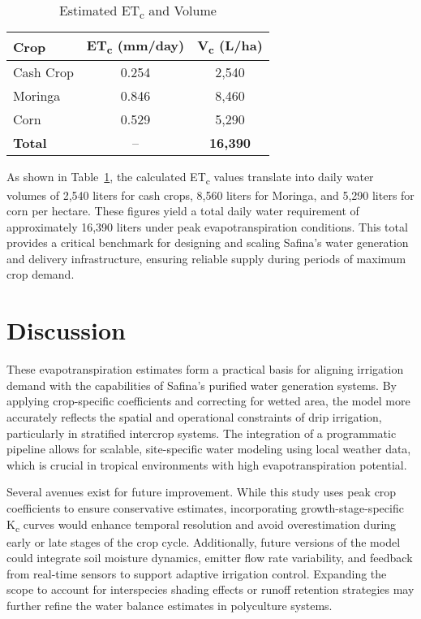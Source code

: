 \documentclass[twocolumn]{article}
\begin{document}
\begin{table}[h]
\centering
\caption{Estimated ET\textsubscript{c} and Volume}
\label{tab:et-results}
\begin{tabular}{lcc}
\hline
\textbf{Crop} & \textbf{ET\textsubscript{c} (mm/day)} & \textbf{V\textsubscript{c} (L/ha)} \\
\hline
Cash Crop & 0.254 & 2,540 \\
Moringa  & 0.846 & 8,460 \\
Corn     & 0.529 & 5,290 \\
\hline
\textbf{Total} & -- & \textbf{16,390} \\
\hline
\end{tabular}
\end{table}

As shown in Table~\ref{tab:et-results}, the calculated ET\textsubscript{c} values translate into daily water volumes of 2,540 liters for cash crops, 8,560 liters for Moringa, and 5,290 liters for corn per hectare. These figures yield a total daily water requirement of approximately 16,390 liters under peak evapotranspiration conditions. This total provides a critical benchmark for designing and scaling Safina’s water generation and delivery infrastructure, ensuring reliable supply during periods of maximum crop demand.

\section{Discussion}
These evapotranspiration estimates form a practical basis for aligning irrigation demand with the capabilities of Safina’s purified water generation systems. By applying crop-specific coefficients and correcting for wetted area, the model more accurately reflects the spatial and operational constraints of drip irrigation, particularly in stratified intercrop systems. The integration of a programmatic pipeline allows for scalable, site-specific water modeling using local weather data, which is crucial in tropical environments with high evapotranspiration potential.

Several avenues exist for future improvement. While this study uses peak crop coefficients to ensure conservative estimates, incorporating growth-stage-specific K\textsubscript{c} curves would enhance temporal resolution and avoid overestimation during early or late stages of the crop cycle. Additionally, future versions of the model could integrate soil moisture dynamics, emitter flow rate variability, and feedback from real-time sensors to support adaptive irrigation control. Expanding the scope to account for interspecies shading effects or runoff retention strategies may further refine the water balance estimates in polyculture systems.
\end{document}
